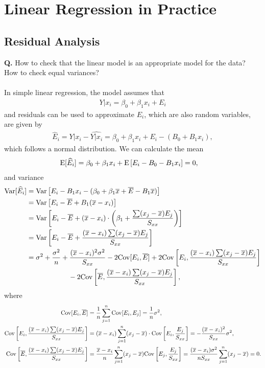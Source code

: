\section*{Linear Regression in Practice}

\subsection*{Residual Analysis}

\textbf{Q.} How to check that the linear model is an appropriate model for the data? How to check equal variances? \\
~\\
In simple linear regression, the model assumes that
\begin{align*}
Y|x_i = \beta_0 + \beta_1 x_i + E_i
\end{align*}
and residuals can be used to approximate $E_i$, which are also random variables, are given by
\begin{align*}
\widehat{E}_i = Y|x_i - \widehat{Y|x_i} = \beta_0 + \beta_1 x_i + E_i - (B_0 + B_1 x_i),
\end{align*}
which follows a normal distribution. We can calculate the mean
\begin{align*}
\mathrm{E}[\widehat{E}_i] & = \beta_0 + \beta_1 x_i + \mathrm{E}\left[E_i - B_0 - B_1x_i \right] = 0,
\end{align*}
and variance
\begin{align*}
\mathrm{Var}[\widehat{E}_i] & = \mathrm{Var}\left[E_i - B_1 x_i - (\beta_0 + \beta_1 \overline{x} + \overline{E} - B_1 \overline{x}) \right] \\
& = \mathrm{Var}\left[E_i - \overline{E} + B_1(\overline{x} - x_i) \right] \\
& = \mathrm{Var}\left[E_i - \overline{E} + (\overline{x} - x_i)\cdot \left(\beta_1 + \frac{\sum(x_j-\overline{x})E_j}{S_{xx}} \right) \right] \\
& = \mathrm{Var}\left[E_i - \overline{E} +  \frac{(\overline{x} - x_i)\sum(x_j-\overline{x})E_j}{S_{xx}} \right] \\
& = \sigma^2 + \frac{\sigma^2}{n} + \frac{(\overline{x}-x_i)^2\sigma^2}{S_{xx}} - 2\mathrm{Cov}[E_i, \overline{E}] + 2\mathrm{Cov}\left[E_i, \frac{(\overline{x} - x_i)\sum(x_j-\overline{x})E_j}{S_{xx}} \right] \\
&\qquad\qquad\qquad - 2\mathrm{Cov}\left[\overline{E}, \frac{(\overline{x} - x_i)\sum(x_j-\overline{x})E_j}{S_{xx}} \right],
\end{align*}
where
\begin{align*}
\mathrm{Cov}[E_i, \overline{E}] & = \frac{1}{n}\sum_{j=1}^n \mathrm{Cov}[E_i, E_j] = \frac{1}{n}\sigma^2, \\
\mathrm{Cov}\left[E_i, \frac{(\overline{x} - x_i)\sum(x_j-\overline{x})E_j}{S_{xx}} \right] & = (\overline{x} - x_i)\sum_{j=1}^n (x_j-\overline{x})\cdot \mathrm{Cov}\left[E_i, \frac{E_j}{S_{xx}} \right] = -\frac{(\overline{x}-x_i)^2}{S_{xx}}\sigma^2, \\
\mathrm{Cov}\left[\overline{E}, \frac{(\overline{x} - x_i)\sum(x_j-\overline{x})E_j}{S_{xx}} \right] & = \frac{\overline{x}-x_i}{n}\sum_{j=1}^n (x_j-\overline{x})\mathrm{Cov}\left[E_j, \frac{E_j}{S_{xx}} \right] = \frac{(\overline{x} - x_i)\sigma^2}{nS_{xx}} \sum_{j=1}^n (x_j - \overline{x}) = 0.
\end{align*}
